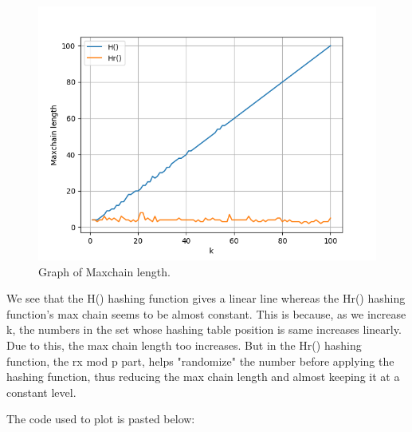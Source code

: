\documentclass[a4paper]{article}
\begin{document}
\begin{enumerate}[label=(\alph*)]
\begin{figure}[H]
            \centering
        	\includegraphics[scale=0.65]{plot5.png}
        	\caption{Graph of Maxchain length. \label{fig:1}}
        \end{figure}
        
        We see that the H() hashing function gives a linear line whereas the Hr() hashing function's max chain seems to be almost constant. This is because, as we increase k, the numbers in the set whose hashing table position is same increases linearly. Due to this, the max chain length too increases. But in the Hr() hashing function, the rx mod p part, helps "randomize" the number before applying the hashing function, thus reducing the max chain length and almost keeping it at a constant level.
\end{enumerate}

The code used to plot is pasted below:



\end{document}
